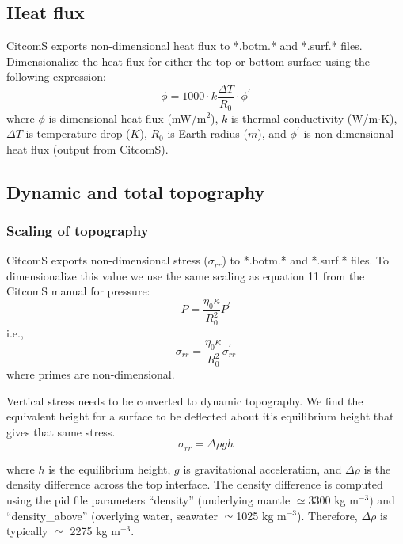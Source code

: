 \documentclass[letterpaper,12pt]{article}
\begin{document}
\subsection{Heat flux}
CitcomS exports non-dimensional heat flux to *.botm.* and *.surf.* files.  Dimensionalize the heat flux for either the top or bottom surface using the following expression:
\begin{equation}
\phi = 1000 \cdot k \frac{\Delta T}{R_0} \cdot \phi^\prime
\end{equation}
where $\phi$ is dimensional heat flux (mW/m$^2$), $k$ is thermal conductivity (W/m$\cdot$K), $\Delta T$ is temperature drop ($K$), $R_0$ is Earth radius ($m$), and $\phi^\prime$ is non-dimensional heat flux (output from CitcomS).

\subsection{Dynamic and total topography}
\subsubsection{Scaling of topography}

CitcomS exports non-dimensional stress ($\sigma_{rr}$) to *.botm.* and *.surf.* files.  To dimensionalize this value we use the same scaling as equation 11 from the CitcomS manual for pressure:
\begin{equation}
P = \frac{\eta_0 \kappa}{R_0^2} P^\prime
\end{equation}
i.e.,
\begin{equation}
\sigma_{rr} = \frac{\eta_0 \kappa}{R_0^2} \sigma_{rr}^\prime
\end{equation}
where primes are non-dimensional.

Vertical stress needs to be converted to dynamic topography. We find the equivalent height for a surface to be deflected about it's equilibrium height that gives that same stress.
\begin{equation}
\sigma_{rr} = \Delta \rho g h
\end{equation}

where $h$ is the equilibrium height, $g$ is gravitational acceleration, and $\Delta \rho$ is the density difference across the top interface.  The density difference is computed using the pid file parameters ``density'' (underlying mantle $\simeq$3300 kg m$^{-3}$) and ``density\_above'' (overlying water, seawater $\simeq$1025 kg m$^{-3}$).  Therefore, $\Delta \rho$ is typically $\simeq$ 2275 kg m$^{-3}$.
\end{document}
